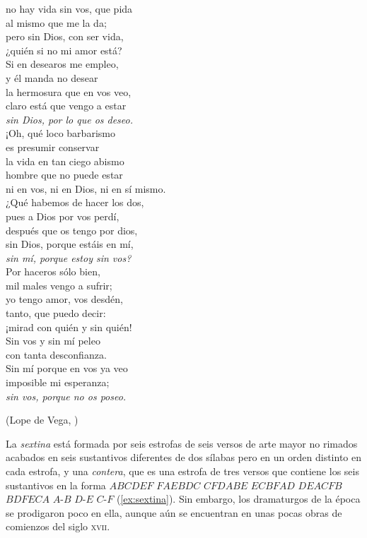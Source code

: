 \begin{exe}
\begin{multicols}{2}
	no hay vida sin vos, que pida\\
	al mismo que me la da;\\
	pero sin Dios, con ser vida,\\
	¿quién si no mi amor está?\\
	Si en desearos me empleo,\\
	y él manda no desear\\
	la hermosura que en vos veo,\\
	claro está que vengo a estar\\
	\textit{sin Dios, por lo que os deseo.}\vspace{.222\baselineskip}\\
	¡Oh, qué loco barbarismo\\
	es presumir conservar\\
	la vida en tan ciego abismo\\
	hombre que no puede estar\\
	ni en vos, ni en Dios, ni en sí mismo.\\
	¿Qué habemos de hacer los dos,\\
	pues a Dios por vos perdí,\\
	después que os tengo por dios,\\
	sin Dios, porque estáis en mí,\\
	\textit{sin mí, porque estoy sin vos?}\vspace{.222\baselineskip}\\
	Por haceros sólo bien,\\
	mil males vengo a sufrir;\\
	yo tengo amor, vos desdén,\\
	tanto, que puedo decir:\\
	¡mirad con quién y sin quién!\\
	Sin vos y sin mí peleo\\
	con tanta desconfianza.\\
	Sin mí porque en vos ya veo\\
	imposible mi esperanza;\\
	\textit{sin vos, porque no os poseo.}\end{multicols}	
	\strut\hfill(Lope de Vega, )
\end{exe}

La \textit{sextina} está formada por seis estrofas de seis versos de arte mayor no rimados acabados en seis sustantivos diferentes de dos sílabas pero en un orden distinto en cada estrofa, y una \textit{contera}, que es una estrofa de tres versos que contiene los seis sustantivos en la forma $ABCDEF$ $FAEBDC$ $CFDABE$ $ECBFAD$ $DEACFB$ $BDFECA$ $A\text{-}B$ $D\text{-}E$ $C\text{-}F$ (\ref{ex:sextina}). Sin embargo, los dramaturgos de la época se prodigaron poco en ella, aunque aún se encuentran en unas pocas obras de comienzos del siglo \textsc{xvii}.

